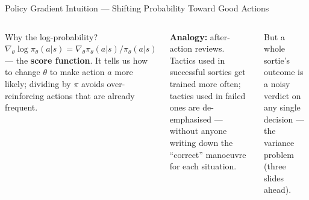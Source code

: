 \documentclass[aspectratio=169,10pt,t]{beamer}
\begin{document}
\begin{frame}{Policy Gradient Intuition --- Shifting Probability Toward Good Actions}
\begin{columns}[T]
\begin{cbox}{Why the log-probability?}\scriptsize $\nabla_\theta\log\pi_\theta(a|s)=\nabla_\theta\pi_\theta(a|s)/\pi_\theta(a|s)$ --- the \textbf{score function}. It tells us how to change $\theta$ to make action $a$ more likely; dividing by $\pi$ avoids over-reinforcing actions that are already frequent.\end{cbox}
\begin{ibox}\scriptsize\textbf{Analogy:} after-action reviews. Tactics used in successful sorties get trained more often; tactics used in failed ones are de-emphasised --- without anyone writing down the ``correct'' manoeuvre for each situation.\end{ibox}
\begin{wbox}\scriptsize But a whole sortie's outcome is a noisy verdict on any single decision --- the variance problem (three slides ahead).\end{wbox}
\end{columns}
\end{frame}
\end{document}
